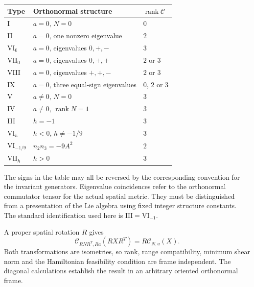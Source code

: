 \begin{center}
\begin{tabular}{lll}
\hline
Type & Orthonormal structure & $\operatorname{rank}\mathcal C$\\
\hline
I & $a=0$, $N=0$ & $0$\\
II & $a=0$, one nonzero eigenvalue & $2$\\
$\mathrm{VI}_0$ & $a=0$, eigenvalues $0,+,-$ & $3$\\
$\mathrm{VII}_0$ & $a=0$, eigenvalues $0,+,+$ & $2$ or $3$\\
VIII & $a=0$, eigenvalues $+,+,-$ & $2$ or $3$\\
IX & $a=0$, three equal-sign eigenvalues & $0$, $2$ or $3$\\
V & $a\ne0$, $N=0$ & $3$\\
IV & $a\ne0$, $\operatorname{rank}N=1$ & $3$\\
III & $h=-1$ & $3$\\
$\mathrm{VI}_h$ & $h<0$, $h\ne-1/9$ & $3$\\
$\mathrm{VI}_{-1/9}$ & $n_2n_3=-9A^2$ & $2$\\
$\mathrm{VII}_h$ & $h>0$ & $3$\\
\hline
\end{tabular}
\end{center}
The signs in the table may all be reversed by the corresponding convention for the invariant generators. Eigenvalue coincidences refer to the orthonormal commutator tensor for the actual spatial metric. They must be distinguished from a presentation of the Lie algebra using fixed integer structure constants. The standard identification used here is $\mathrm{III}=\mathrm{VI}_{-1}$.

A proper spatial rotation $R$ gives
\begin{equation}
 \mathcal C_{RNR^T,Ra}(RXR^T)=R\mathcal C_{N,a}(X).
 \label{geo:equivariance}
\end{equation}
Both transformations are isometries, so rank, range compatibility, minimum shear norm and the Hamiltonian feasibility condition are frame independent. The diagonal calculations establish the result in an arbitrary oriented orthonormal frame.


